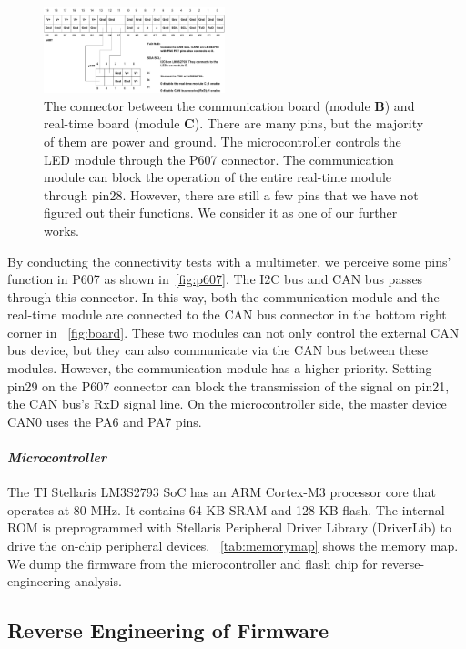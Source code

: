 \begin{figure}[tp!]
	\includegraphics[width=0.47\textwidth]{figures/p607-2}
	\centering
	\caption{The connector between the communication board (module \textbf{B}) and real-time board (module \textbf{C}).  There are many pins, but the majority of them are power and ground. The microcontroller controls the LED module through the P607 connector.  The communication module can block the operation of the entire real-time module through pin28. However, there are still a few pins that we have not figured out their functions. We consider it as one of our further works.}
	\label{fig:p607}
\end{figure}

By conducting the connectivity tests with a multimeter, we perceive some pins' function in P607 as shown in~\autoref{fig:p607}. The I2C bus and CAN bus passes through this connector. In this way, both the communication module and the real-time module are connected to the CAN bus connector in the bottom right corner in ~\autoref{fig:board}. These two modules can not only control the external CAN bus device, but they can also communicate via the CAN bus between these modules. However, the communication module has a higher priority. Setting pin29 on the P607 connector can block the transmission of the signal on pin21, the CAN bus's RxD signal line. On the microcontroller side, the master device CAN0 uses the PA6 and PA7 pins. 

\paragraph{\textbf{\textit{Microcontroller}}} The TI Stellaris LM3S2793 SoC has an ARM Cortex-M3 processor core that operates at 80 MHz. It contains 64 KB SRAM and 128 KB flash. The internal ROM is preprogrammed with Stellaris Peripheral Driver Library (DriverLib) to drive the on-chip peripheral devices. ~\autoref{tab:memorymap} shows the memory map. We dump the firmware from the microcontroller and flash chip for reverse-engineering analysis.

\subsection{Reverse Engineering of Firmware}

